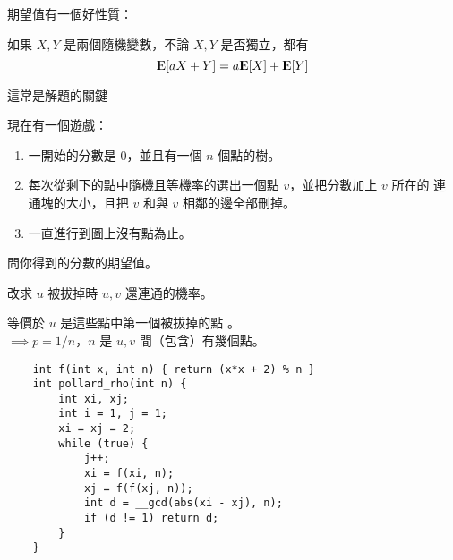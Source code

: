 \documentclass[standalone]{beamer}
\begin{document}
\begin{frame}{}
  期望值有一個好性質：
  \begin{theorem} 如果 $X, Y$ 是兩個隨機變數，\alert<1>{不論 $X, Y$ 是否獨立}，都有
  \[
    {\rm I\kern-.3em E}[aX + Y] = a{\rm I\kern-.3em E}[X] + {\rm I\kern-.3em E}[Y] \label{eq:expect_linear}
  \]
  \pause
  \end{theorem}
  這常是解題的關鍵
\end{frame}

\begin{frame}{}
  \begin{problem}
    現在有一個遊戲： \pause
    \begin{enumerate}[<+->]
      \item 一開始的分數是 $0$，並且有一個 $n$ 個點的樹。
      \item 每次從剩下的點中隨機且等機率的選出一個點 $v$，並把分數加上 $v$ 所在的
        連通塊的大小，且把 $v$ 和與 $v$ 相鄰的邊全部刪掉。
      \item 一直進行到圖上沒有點為止。
    \end{enumerate}

    \onslide<+->
    問你得到的分數的期望值。
  \end{problem}
\end{frame}

\begin{frame}{}
  改求 $u$ 被拔掉時 $u, v$ 還連通的機率。 \pause
  \begin{figure}
  \end{figure} \pause

  等價於 $u$ 是這些點中第一個被拔掉的點 \pause。 \\
  $\implies p = 1/n$，$n$ 是 $u, v$ 間（包含）有幾個點。
\end{frame}

\begin{frame}[fragile]{}
  \begin{verbatim}
    int f(int x, int n) { return (x*x + 2) % n }
    int pollard_rho(int n) {
        int xi, xj;
        int i = 1, j = 1;
        xi = xj = 2;
        while (true) {
            j++;
            xi = f(xi, n);
            xj = f(f(xj, n));
            int d = __gcd(abs(xi - xj), n);
            if (d != 1) return d;
        }
    }
  \end{verbatim}
\end{frame}
\end{document}
